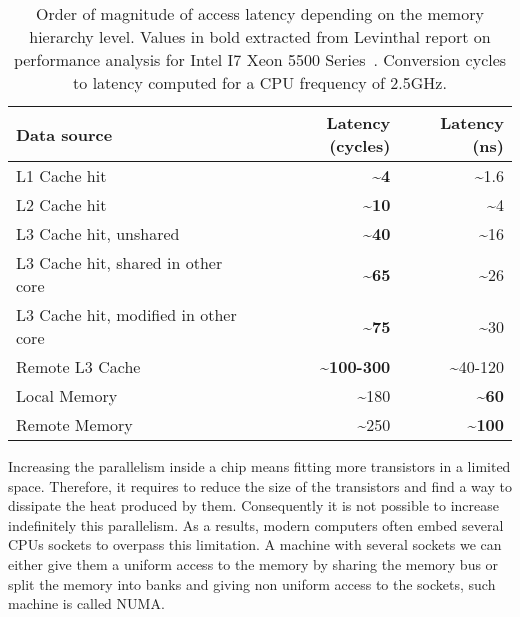 \begin{table}[htb]
    \centering
    \begin{tabular}{lrr}
        \toprule
        \textbf{Data source} & \textbf{Latency (cycles)} & \textbf{Latency (ns)}\\
        \midrule
        L1 Cache hit                            & \textbf{\textasciitilde4}          & \textasciitilde1.6\\
        L2 Cache hit                            & \textbf{\textasciitilde10}         & \textasciitilde4\\
        \midrule
        L3 Cache hit, unshared                  & \textbf{\textasciitilde40}         & \textasciitilde16\\
        L3 Cache hit, shared in other core      & \textbf{\textasciitilde65}         & \textasciitilde26\\
        L3 Cache hit, modified in other core    & \textbf{\textasciitilde75}         & \textasciitilde30\\
        Remote L3 Cache                         & \textbf{\textasciitilde100-300}    & \textasciitilde40-120\\
        \midrule
        Local Memory                            & \textasciitilde180                 & \textbf{\textasciitilde60} \\
        Remote Memory                           & \textasciitilde250                 & \textbf{\textasciitilde100} \\
        \bottomrule
    \end{tabular}
    \caption[Approximate access latency depending on the memory hierarchy level.]{Order of magnitude of access latency depending on the memory hierarchy level.
    Values in bold extracted from Levinthal report on performance analysis for \gls{Intel} I7 Xeon 5500 Series~\cite{Levinthal09Performance}.
    Conversion cycles to latency computed for a CPU frequency of 2.5GHz.
}
\label{tab:mem-latency}
\end{table}
Increasing the parallelism inside a chip means fitting more transistors in a limited space.
Therefore, it requires to reduce the size of the transistors and find a way to dissipate the heat produced by them.
Consequently it is not possible to increase indefinitely this parallelism.
As a results, modern computers often embed several \glspl{CPU} sockets to overpass this limitation.
A machine with several sockets we can either give them a uniform access to the memory by sharing the memory bus or split the memory into banks and giving non uniform access to the sockets, such machine is called \gls{NUMA}.
